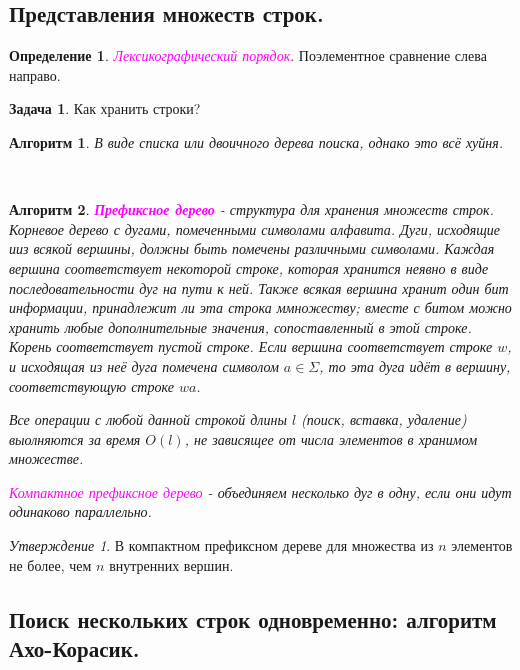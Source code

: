 \documentclass[a4paper]{article}
\theoremstyle{indented}
\newtheorem{alg}{Алгоритм}
\theoremstyle{definition}
\newtheorem{defn}{Определение}
\newtheorem{prob}{Задача}
\theoremstyle{remark}
\newtheorem{stat}{Утверждение}
\begin{document}
\subsection{Представления множеств строк.}

\begin{defn}
    \textcolor{magenta}{\hypertarget{d25}{\textit{Лексикографический порядок}}}. Поэлементное сравнение слева направо.
\end{defn}

\begin{prob}
    Как хранить строки?
\end{prob}

\begin{alg}
    В виде списка или двоичного дерева поиска, однако это всё хуйня.
\end{alg} \ 

\begin{alg}
    \textcolor{magenta}{\hypertarget{t32}{\textbf{Префиксное дерево}}} - структура для хранения множеств строк. Корневое дерево с дугами, помеченными символами алфавита. Дуги, исходящие ииз всякой вершины, должны быть помечены различными символами. Каждая вершина соответствует некоторой строке, которая хранится неявно в виде последовательности дуг на пути к ней. Также всякая вершина хранит один бит информации, принадлежит ли эта строка ммножеству; вместе с битом можно хранить любые дополнительные значения, сопоставленный в этой строке. Корень соответствует пустой строке. Если вершина соответствует строке $w$, и исходящая из неё дуга помечена символом $a\in \Sigma$, то эта дуга идёт в вершину, соответствующую строке $wa$. \ 

    Все операции с любой данной строкой длины $l$ (поиск, вставка, удаление) выолняются за время $O(l)$, не зависящее от числа элементов в хранимом множестве. \ 

    \textcolor{magenta}{\hypertarget{d26}{\textit{Компактное префиксное дерево}}} - объединяем несколько дуг в одну, если они идут одинаково параллельно.
\end{alg}

\begin{stat}
    В компактном префиксном дереве для множества из $n$ элементов не более, чем $n$ внутренних вершин.
\end{stat}

\subsection{Поиск нескольких строк одновременно: алгоритм Ахо-Корасик.}
\end{document}

